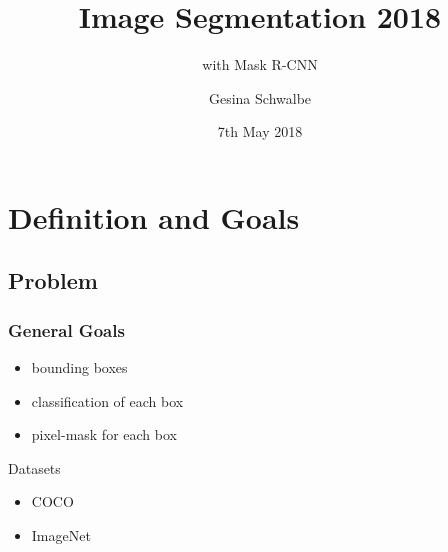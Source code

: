 
\usepackage{fontspec}
\usepackage[shorthands=off]{babel}
\usepackage{csquotes}
\usepackage{lmodern}
\usepackage{graphicx}
\graphicspath{{./images/}}
\usepackage{mathtools,dsfont}
\usepackage{booktabs}
\usepackage[style=numeric, backend=biber]{biblatex}





\title{Image Segmentation 2018}
\subtitle{with Mask R-CNN}
\author{Gesina Schwalbe}
\date{7th May 2018}


\newcommand{\R}{\mathds{R}}
\newcommand{\IoU}{\text{\textbf{IoU}}}
\newcommand{\reg}{\textit{reg}}
\newcommand{\cls}{\textit{cls}}




\frame{\maketitle}
\frame{\tableofcontents[hideallsubsections]}


\section{Definition and Goals}
\subsection{Problem}
\begin{frame}[<+->]
  \frametitle{General Goals}
  \begin{itemize}
  \item bounding boxes
  \item classification of each box
  \item pixel-mask for each box
  \end{itemize}
  \begin{block}{Datasets}
    \begin{itemize}
    \item COCO %
    \item ImageNet %
    \end{itemize}
  \end{block}
\end{frame}


